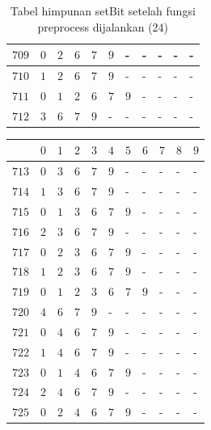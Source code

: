 \begin{appendices}
\begin{table}[H]
\begin{tabular} {|l|l|l|l|l|l|l|l|l|l|l|}
  		$ 709 $ & $ 0 $ &$ 2 $ &$ 6 $ &$ 7 $ &$ 9 $ & - &  - &  - &  - &  -   \\ \hline
  		$ 710 $ & $ 1 $ &$ 2 $ &$ 6 $ &$ 7 $ &$ 9 $ & - &  - &  - &  - &  -   \\ \hline
  		$ 711 $ & $ 0 $ &$ 1 $ &$ 2 $ &$ 6 $ &$ 7 $ &$ 9 $ & - &  - &  - &  -   \\ \hline
  		$ 712 $ & $ 3 $ &$ 6 $ &$ 7 $ &$ 9 $ & - &  - &  - &  - &  - &  -   \\ \hline
  	\end{tabular}\caption{Tabel himpunan setBit setelah fungsi preprocess dijalankan (24)}
  	\label{tab:setbit_24}
  \end{table}
  \begin{table}[H]
  	\centering
  	\begin{tabular} {|l|l|l|l|l|l|l|l|l|l|l|} \hline
  		\backslashbox{$Num$}{$index$} & $ 0 $ & $ 1 $ & $ 2 $ & $ 3 $ & $ 4 $ & $ 5 $ & $ 6 $ & $ 7 $ & $ 8 $ & $ 9 $ \\ \hline
  		$ 713 $ & $ 0 $ &$ 3 $ &$ 6 $ &$ 7 $ &$ 9 $ & - &  - &  - &  - &  -   \\ \hline
  		$ 714 $ & $ 1 $ &$ 3 $ &$ 6 $ &$ 7 $ &$ 9 $ & - &  - &  - &  - &  -   \\ \hline
  		$ 715 $ & $ 0 $ &$ 1 $ &$ 3 $ &$ 6 $ &$ 7 $ &$ 9 $ & - &  - &  - &  -   \\ \hline
  		$ 716 $ & $ 2 $ &$ 3 $ &$ 6 $ &$ 7 $ &$ 9 $ & - &  - &  - &  - &  -   \\ \hline
  		$ 717 $ & $ 0 $ &$ 2 $ &$ 3 $ &$ 6 $ &$ 7 $ &$ 9 $ & - &  - &  - &  -   \\ \hline
  		$ 718 $ & $ 1 $ &$ 2 $ &$ 3 $ &$ 6 $ &$ 7 $ &$ 9 $ & - &  - &  - &  -   \\ \hline
  		$ 719 $ & $ 0 $ &$ 1 $ &$ 2 $ &$ 3 $ &$ 6 $ &$ 7 $ &$ 9 $ & - &  - &  -   \\ \hline
  		$ 720 $ & $ 4 $ &$ 6 $ &$ 7 $ &$ 9 $ & - &  - &  - &  - &  - &  -   \\ \hline
  		$ 721 $ & $ 0 $ &$ 4 $ &$ 6 $ &$ 7 $ &$ 9 $ & - &  - &  - &  - &  -   \\ \hline
  		$ 722 $ & $ 1 $ &$ 4 $ &$ 6 $ &$ 7 $ &$ 9 $ & - &  - &  - &  - &  -   \\ \hline
  		$ 723 $ & $ 0 $ &$ 1 $ &$ 4 $ &$ 6 $ &$ 7 $ &$ 9 $ & - &  - &  - &  -   \\ \hline
  		$ 724 $ & $ 2 $ &$ 4 $ &$ 6 $ &$ 7 $ &$ 9 $ & - &  - &  - &  - &  -   \\ \hline
  		$ 725 $ & $ 0 $ &$ 2 $ &$ 4 $ &$ 6 $ &$ 7 $ &$ 9 $ & - &  - &  - &  -   \\ \hline

\end{tabular}
\end{table}
\end{appendices}
